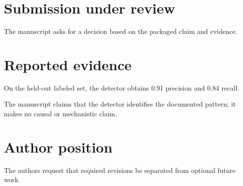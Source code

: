 \documentclass{article}
\begin{document}
\section{Submission under review}
The manuscript asks for a decision based on the packaged claim and evidence.
\section{Reported evidence}
On the held-out labeled set, the detector obtains 0.91 precision and 0.84 recall.

The manuscript claims that the detector identifies the documented pattern; it makes no causal or mechanistic claim.
\section{Author position}
The authors request that required revisions be separated from optional future work.
\end{document}
